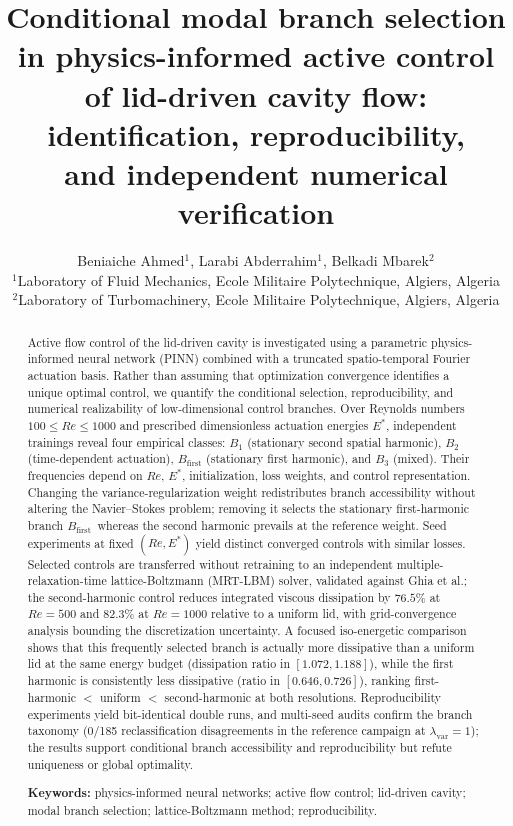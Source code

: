 \documentclass[a4paper,11pt]{article}
\title{\textbf{Conditional modal branch selection in physics-informed active control\\
of lid-driven cavity flow: identification, reproducibility,\\
and independent numerical verification}}
\author{Beniaiche Ahmed\(^{1}\), Larabi Abderrahim\(^{1}\), Belkadi Mbarek\(^{2}\) \\[4pt]
\(^{1}\)Laboratory of Fluid Mechanics, Ecole Militaire Polytechnique, Algiers, Algeria \\
\(^{2}\)Laboratory of Turbomachinery, Ecole Militaire Polytechnique, Algiers, Algeria}
\date{}
\begin{document}
\maketitle

\begin{abstract}
Active flow control of the lid-driven cavity is investigated using a parametric
physics-informed neural network (PINN) combined with a truncated spatio-temporal
Fourier actuation basis. Rather than assuming that optimization convergence
identifies a unique optimal control, we quantify the conditional selection,
reproducibility, and numerical realizability of low-dimensional control branches.
Over Reynolds numbers \(100\le Re\le 1000\) and prescribed dimensionless actuation
energies \(E^*\), independent trainings reveal four empirical classes: \(B_1\)
(stationary second spatial harmonic), \(B_2\) (time-dependent actuation),
\(B_{\mathrm{first}}\) (stationary first harmonic), and \(B_3\) (mixed). Their
frequencies depend on \(Re\), \(E^*\), initialization, loss
weights, and control representation. Changing the variance-regularization weight
redistributes branch accessibility without altering the Navier--Stokes problem;
removing it selects the stationary first-harmonic branch \(B_{\mathrm{first}}\)\,
whereas the second harmonic prevails at the reference weight. Seed experiments at
fixed \((Re,E^*)\) yield distinct converged controls with
similar losses. Selected controls are transferred without retraining to an
independent multiple-relaxation-time lattice-Boltzmann (MRT-LBM) solver, validated
against Ghia et al.; the second-harmonic control reduces integrated viscous
dissipation by \(76.5\%\) at \(Re=500\) and \(82.3\%\) at \(Re=1000\) relative to a
uniform lid, with grid-convergence analysis bounding the discretization
uncertainty. A focused iso-energetic comparison shows that this frequently
selected branch is actually more dissipative than a uniform lid at the same energy
budget (dissipation ratio in \([1.072,1.188]\)), while the first harmonic is
consistently less dissipative (ratio in \([0.646,0.726]\)), ranking first-harmonic
$<$ uniform $<$ second-harmonic at both resolutions. Reproducibility experiments
yield bit-identical double runs, and multi-seed audits confirm the branch taxonomy
(0/185 reclassification disagreements in the reference campaign at
\(\lambda_{\mathrm{var}}=1\)); the results support conditional branch
accessibility and reproducibility but refute uniqueness or global optimality.

\medskip\noindent\textbf{Keywords:} physics-informed neural networks; active flow
control; lid-driven cavity; modal branch selection; lattice-Boltzmann method;
reproducibility.
\end{abstract}
\end{document}

